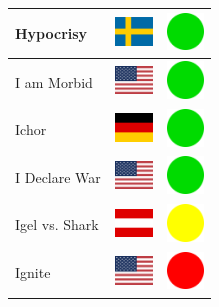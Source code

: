 \documentclass[12pt, a4paper, twoside]{report}
\begin{document}
\begin{center}
\begin{longtable}{|p{5cm}|p{2cm}|p{2cm}|}
Hypocrisy & \includegraphics[width=1cm]{4x3/se} & \includegraphics[width=1cm]{likes/y} \\ \hline
I am Morbid & \includegraphics[width=1cm]{4x3/us} & \includegraphics[width=1cm]{likes/y} \\ \hline
Ichor & \includegraphics[width=1cm]{4x3/de} & \includegraphics[width=1cm]{likes/y} \\ \hline
I Declare War & \includegraphics[width=1cm]{4x3/us} & \includegraphics[width=1cm]{likes/y} \\ \hline
Igel vs. Shark & \includegraphics[width=1cm]{4x3/at} & \includegraphics[width=1cm]{likes/m} \\ \hline
Ignite & \includegraphics[width=1cm]{4x3/us} & \includegraphics[width=1cm]{likes/n} \\ \hline

\end{longtable}
\end{center}
\end{document}
